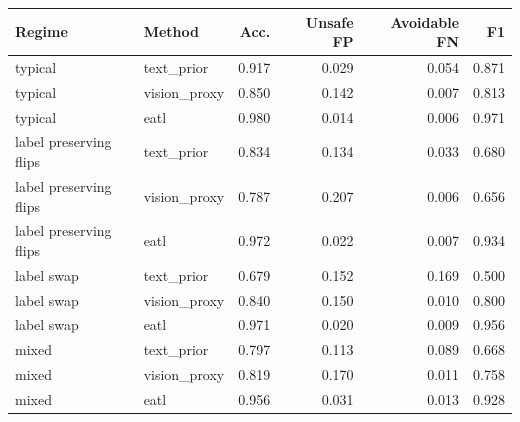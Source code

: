 \begin{tabular}{llrrrr}
\toprule
Regime & Method & Acc. & Unsafe FP & Avoidable FN & F1 \\
\midrule
typical & text\_prior & 0.917 & 0.029 & 0.054 & 0.871 \\
typical & vision\_proxy & 0.850 & 0.142 & 0.007 & 0.813 \\
typical & eatl & 0.980 & 0.014 & 0.006 & 0.971 \\
\midrule
label preserving flips & text\_prior & 0.834 & 0.134 & 0.033 & 0.680 \\
label preserving flips & vision\_proxy & 0.787 & 0.207 & 0.006 & 0.656 \\
label preserving flips & eatl & 0.972 & 0.022 & 0.007 & 0.934 \\
\midrule
label swap & text\_prior & 0.679 & 0.152 & 0.169 & 0.500 \\
label swap & vision\_proxy & 0.840 & 0.150 & 0.010 & 0.800 \\
label swap & eatl & 0.971 & 0.020 & 0.009 & 0.956 \\
\midrule
mixed & text\_prior & 0.797 & 0.113 & 0.089 & 0.668 \\
mixed & vision\_proxy & 0.819 & 0.170 & 0.011 & 0.758 \\
mixed & eatl & 0.956 & 0.031 & 0.013 & 0.928 \\
\bottomrule
\end{tabular}
